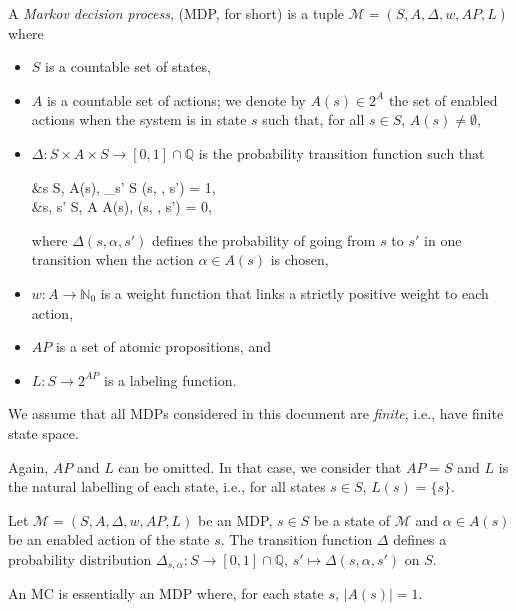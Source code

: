 \begin{definition}
	A \textit{Markov decision process}, (MDP, for short) is a tuple $\mathcal{M}  = (S, A, \Delta, w, AP, L)$ where
	\begin{itemize}
		\item $S$ is a countable set of states,
		\item $A$ is a countable set of actions; we denote by $A(s) \in 2^A$  the set of enabled actions when the system is in state $s$ such that, for all $s \in S$,
    $A(s) \neq \emptyset$,
		\item $\Delta: S \times A \times S \rightarrow [0, 1] \cap \mathbb{Q}$ is the probability transition function such that
		\begin{flalign*}
			&\forall s \in S, \; \forall \alpha \in A(s), \; \sum_{s' \in S} \Delta(s, \alpha, s') = 1,  \\
			&\forall s, s' \in S, \; \forall \alpha \in A \setminus A(s), \; \Delta(s, \alpha, s') = 0,
		\end{flalign*}

			where $\Delta(s, \alpha, s')$ defines the probability of going from $s$ to $s'$ in one transition when the action $\alpha \in A(s)$ is chosen,
    \item $w: A \rightarrow \mathbb{N}_0$ %
      is a weight function that links a strictly positive weight to each action,
    \item $AP$ is a set of atomic propositions, and
    \item $L: S \rightarrow 2^{AP}$ is a labeling function.
	\end{itemize}
\end{definition}
We assume that all MDPs considered in this document are \textit{finite}, i.e., have finite state space.

\begin{remark}
  Again, $AP$ and $L$ can be omitted. In that case, we consider that $AP=S$ and $L$ is the natural labelling of each state, i.e., for all states $s \in S$, $L(s) = \{s\}$.
\end{remark}

\begin{property}
  Let $\mathcal{M} = (S,A, \Delta, w, AP, L)$ be an MDP, $s \in S$ be a state of $\mathcal{M}$ and $\alpha \in A(s)$ be an enabled action of the state $s$. The transition function $\Delta$ defines a probability distribution $\Delta_{s, \alpha}: S \rightarrow [0, 1]\cap \mathbb{Q}, \, s' \mapsto \Delta(s, \alpha, s')$ on $S$.
\end{property}
\begin{property}
  An MC is essentially an MDP where, for each state $s$, $|A(s)| = 1$.
\end{property}

